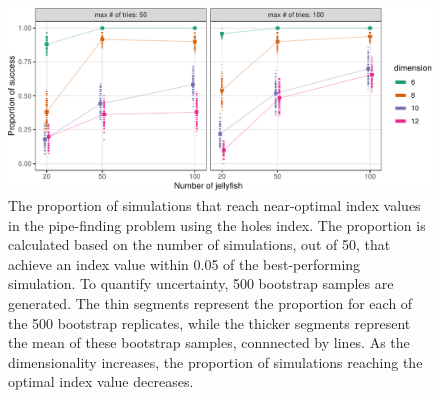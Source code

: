 \documentclass[
  12pt,
]{interact}
\theoremstyle{plain}
\begin{document}
\begin{figure}

{\centering \includegraphics{jso_files/figure-pdf/fig-proportion-1.pdf}

}

\caption{\label{fig-proportion}The proportion of simulations that reach
near-optimal index values in the pipe-finding problem using the holes
index. The proportion is calculated based on the number of simulations,
out of 50, that achieve an index value within 0.05 of the
best-performing simulation. To quantify uncertainty, 500 bootstrap
samples are generated. The thin segments represent the proportion for
each of the 500 bootstrap replicates, while the thicker segments
represent the mean of these bootstrap samples, connnected by lines. As
the dimensionality increases, the proportion of simulations reaching the
optimal index value decreases.}

\end{figure}
\end{document}
